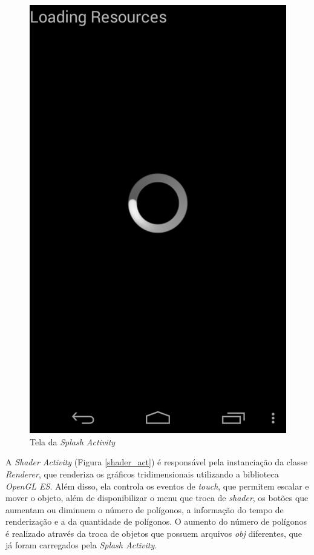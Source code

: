 	\begin{figure}[ht]
	\centering
		\includegraphics[keepaspectratio=true,scale=0.2]{figuras/splash_act.png}
	\caption{Tela da \textit{Splash Activity}}
	\label{splash_act}
	\end{figure}

	A \textit{Shader Activity} (Figura  \ref{shader_act}) é responsável pela  instanciação da classe \textit{Renderer}, que renderiza os gráficos tridimensionais utilizando a biblioteca \textit{OpenGL ES}. Além disso, ela controla os eventos de \textit{touch}, que permitem escalar e mover o objeto, além de disponibilizar o menu que troca de \textit{shader}, os botões que aumentam ou diminuem o número de polígonos, a informação do tempo de renderização e a da quantidade de polígonos. O aumento do número de polígonos é realizado através da troca de objetos que possuem arquivos \textit{obj} diferentes, que já foram carregados pela \textit{Splash Activity}. 

